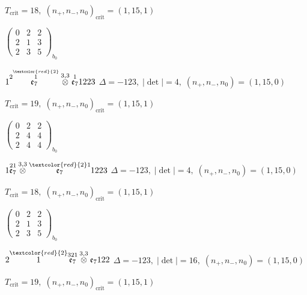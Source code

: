 \documentclass[10pt]{article}
\begin{document}
\hspace{1em}$T_{\text{crit}}=18,\; (n_+,n_-,n_0)_{\text{crit}}=(1,15,1)$

\hspace{2em}$\left(\begin{smallmatrix}0 & 2 & 2 \\ 2 & 1 & 3 \\ 2 & 3 & 5\end{smallmatrix}\right)_{\!b_0}$

\smallskip

$1\overset{2\overset{\textcolor{red}{2}}{1}}{\mathfrak{e}_7}\overset{3,3}{\otimes}\overset{1}{\mathfrak{e}_7}1223$ \quad $\Delta=-123,\; |\det|=4,\; (n_+,n_-,n_0)=(1,15,0)$

\hspace{1em}$T_{\text{crit}}=19,\; (n_+,n_-,n_0)_{\text{crit}}=(1,15,1)$

\hspace{2em}$\left(\begin{smallmatrix}0 & 2 & 2 \\ 2 & 4 & 4 \\ 2 & 4 & 4\end{smallmatrix}\right)_{\!b_0}$

$1\overset{21}{\mathfrak{e}_7}\overset{3,3}{\otimes}\overset{\textcolor{red}{2}1}{\mathfrak{e}_7}1223$ \quad $\Delta=-123,\; |\det|=4,\; (n_+,n_-,n_0)=(1,15,0)$

\hspace{1em}$T_{\text{crit}}=18,\; (n_+,n_-,n_0)_{\text{crit}}=(1,15,1)$

\hspace{2em}$\left(\begin{smallmatrix}0 & 2 & 2 \\ 2 & 1 & 3 \\ 2 & 3 & 5\end{smallmatrix}\right)_{\!b_0}$

\smallskip

$2\overset{\textcolor{red}{2}}{1}\overset{321}{\mathfrak{e}_7}\overset{3,3}{\otimes}\mathfrak{e}_7122$ \quad $\Delta=-123,\; |\det|=16,\; (n_+,n_-,n_0)=(1,15,0)$

\hspace{1em}$T_{\text{crit}}=19,\; (n_+,n_-,n_0)_{\text{crit}}=(1,15,1)$
\end{document}

